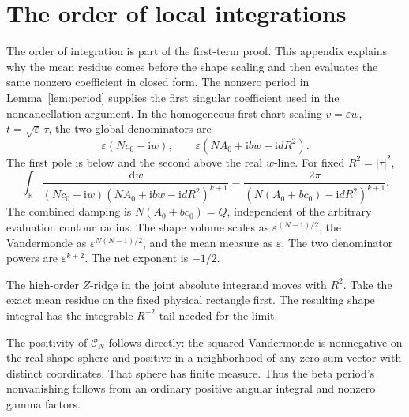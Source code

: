 \documentclass[11pt]{article}
\numberwithin{equation}{section}
\theoremstyle{definition}
\newcommand{\dd}{\,\mathrm d}
\newcommand{\ii}{\mathrm i}
\newcommand{\R}{\mathbb R}
\newcommand{\eps}{\varepsilon}
\begin{document}
\section{The order of local integrations}\label{app:local}

The order of integration is part of the first-term proof. This appendix
explains why the mean residue comes before the shape scaling and then
evaluates the same nonzero coefficient in closed form. The nonzero
period in Lemma~\ref{lem:period} supplies the first singular coefficient
used in the noncancellation argument.
In the homogeneous first-chart scaling \(v=\eps w\),
\(t=\sqrt\eps\,\tau\), the two global denominators are
\[
 \eps(Nc_0-\ii w),\qquad
 \eps(NA_0+\ii bw-\ii dR^2).
\]
The first pole is below and the second above the real \(w\)-line.
For fixed \(R^2=|\tau|^2\),
\[
 \int_\R
 \frac{\dd w}{(Nc_0-\ii w)(NA_0+\ii bw-\ii dR^2)^{k+1}}
 =\frac{2\pi}{(N(A_0+bc_0)-\ii dR^2)^{k+1}}.
\]
The combined damping is \(N(A_0+bc_0)=Q\), independent of the arbitrary
evaluation contour radius. The shape volume scales as
\(\eps^{(N-1)/2}\), the Vandermonde as
\(\eps^{N(N-1)/2}\), and the mean measure as \(\eps\).
The two denominator powers are \(\eps^{k+2}\).
The net exponent is \(-1/2\).

The high-order \(Z\)-ridge in the joint absolute integrand moves
with \(R^2\). Take the exact mean residue on the fixed physical
rectangle first. The resulting shape integral has the integrable
\(R^{-2}\) tail needed for the limit.

The positivity of \(\mathscr C_N\) follows directly: the squared Vandermonde is nonnegative on the real shape sphere and
positive in a neighborhood of any zero-sum vector with distinct
coordinates. That sphere has finite measure. Thus the beta period's
nonvanishing follows from an ordinary positive angular integral and
nonzero gamma factors.
\end{document}
